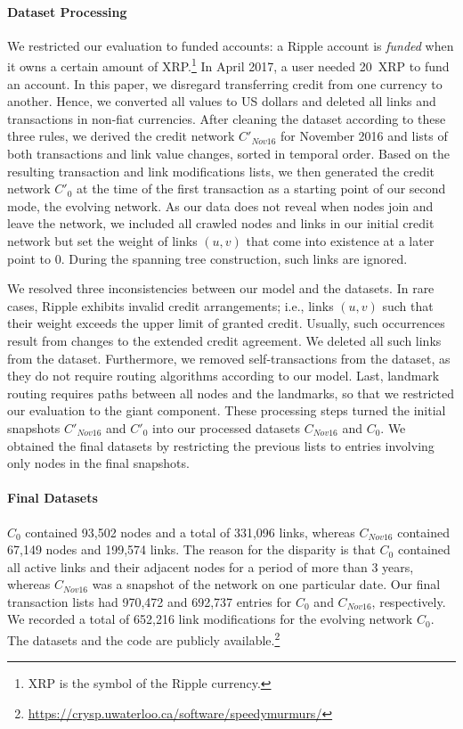 \paragraph*{Dataset Processing} We restricted our evaluation to funded accounts: a Ripple account is {\em funded} when it owns a certain amount of XRP.\footnote{XRP is the symbol of the
Ripple currency.}  In April 2017, a user needed 20~XRP to fund an account. 
In this paper, we disregard transferring credit from one currency to another. Hence, we converted all values to US dollars and deleted all links and transactions in non-fiat currencies.
After cleaning the dataset according to these three rules, we derived the credit network $C'_{Nov16}$ for November 2016 and lists of both transactions and link value changes, sorted in temporal order. 
Based on the resulting transaction and link modifications lists, we then generated the credit network $C'_0$ at the time of the first transaction as a starting point of our second mode, the evolving network. 
As our data does not reveal when nodes join and leave the network, we included all crawled nodes and links in our initial credit network but set the weight of links $(u,v)$ that come into existence at a later point to $0$.
During the spanning tree construction, such links are ignored. 

We resolved three inconsistencies between our model and the datasets.
In rare cases, Ripple exhibits invalid credit arrangements; i.e., links $(u,v)$ such that their weight exceeds the upper limit of granted credit. Usually, such occurrences result from changes to the extended credit agreement. We deleted all such links from the dataset.  
Furthermore, we removed  self-transactions from the dataset, as they do not require routing algorithms according to our model.
Last, landmark routing requires paths between all nodes and the landmarks, so that we restricted our evaluation to the giant component.
These processing steps turned the initial snapshots $C'_{Nov16}$ and $C'_0$ into our processed datasets $C_{Nov16}$ and $C_0$. 
We obtained the final datasets by restricting the previous lists to entries involving only nodes in the final snapshots. 

\paragraph*{Final Datasets} $C_0$ contained 93,502 nodes and a total of 331,096 links, whereas $C_{Nov16}$ contained 67,149 nodes and 199,574 links. The reason for the disparity is that $C_0$ contained all active links and their adjacent nodes for a period of more than 3 years, whereas $C_{Nov16}$ was a snapshot of the network on one particular date. 
Our final transaction lists had 970,472 and 692,737 entries for $C_0$ and $C_{Nov16}$, respectively.  We recorded a total of 652,216 link modifications for the evolving network $C_0$. 
The datasets and the code are publicly available.\footnote{\url{https://crysp.uwaterloo.ca/software/speedymurmurs/}}

